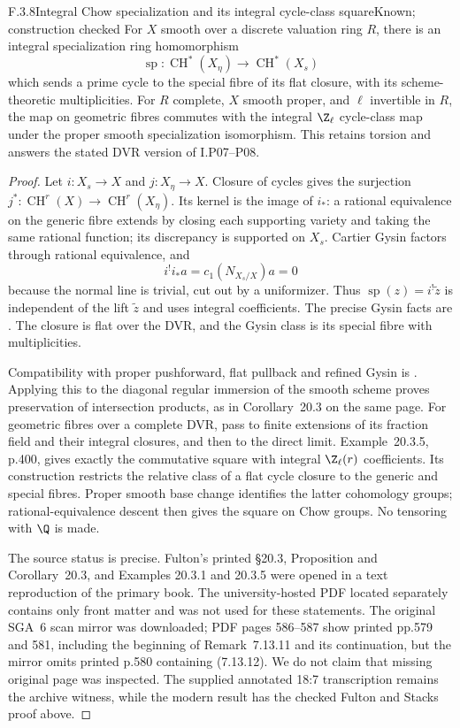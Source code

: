 
\begin{result}{F.3.8}{Integral Chow specialization and its integral cycle-class square}{Known; construction checked}
For $X$ smooth over a discrete valuation ring $R$, there is an integral specialization ring homomorphism
\[
 \operatorname{sp}:\operatorname{CH}^*(X_\eta)
 \longrightarrow\operatorname{CH}^*(X_s)
\]
which sends a prime cycle to the special fibre of its flat closure, with its scheme-theoretic multiplicities. For $R$ complete, $X$ smooth proper, and $\ell$ invertible in $R$, the map on geometric fibres commutes with the integral $\Z_\ell$ cycle-class map under the proper smooth specialization isomorphism. This retains torsion and answers the stated DVR version of I.P07--P08.
\end{result}
\begin{proof}
Let $i:X_s\to X$ and $j:X_\eta\to X$. Closure of cycles gives the surjection $j^*:\operatorname{CH}^r(X)\to\operatorname{CH}^r(X_\eta)$. Its kernel is the image of $i_*$: a rational equivalence on the generic fibre extends by closing each supporting variety and taking the same rational function; its discrepancy is supported on $X_s$. Cartier Gysin factors through rational equivalence, and
\[
 i^!i_*a=c_1(N_{X_s/X})a=0
\]
because the normal line is trivial, cut out by a uniformizer. Thus $\operatorname{sp}(z)=i^!\widetilde z$ is independent of the lift $\widetilde z$ and uses integral coefficients. The precise Gysin facts are \cite[Lemmas 42.30.2--42.30.3]{AuditStacksChow}. The closure is flat over the DVR, and the Gysin class is its special fibre with multiplicities.

Compatibility with proper pushforward, flat pullback and refined Gysin is \cite[Proposition 20.3, p.399]{AuditFulton1998}. Applying this to the diagonal regular immersion of the smooth scheme proves preservation of intersection products, as in Corollary~20.3 on the same page. For geometric fibres over a complete DVR, pass to finite extensions of its fraction field and their integral closures, and then to the direct limit. Example~20.3.5, p.400, gives exactly the commutative square with integral $\Z_\ell(r)$ coefficients. Its construction restricts the relative class of a flat cycle closure to the generic and special fibres. Proper smooth base change identifies the latter cohomology groups; rational-equivalence descent then gives the square on Chow groups. No tensoring with $\Q$ is made.

The source status is precise. Fulton's printed \S20.3, Proposition and Corollary~20.3, and Examples 20.3.1 and 20.3.5 were opened in a text reproduction of the primary book. The university-hosted PDF located separately contains only front matter and was not used for these statements. The original SGA~6 scan mirror \cite{AuditSGA6} was downloaded; PDF pages 586--587 show printed pp.579 and 581, including the beginning of Remark~7.13.11 and its continuation, but the mirror omits printed p.580 containing (7.13.12). We do not claim that missing original page was inspected. The supplied annotated 18:7 transcription remains the archive witness, while the modern result has the checked Fulton and Stacks proof above.
\end{proof}

